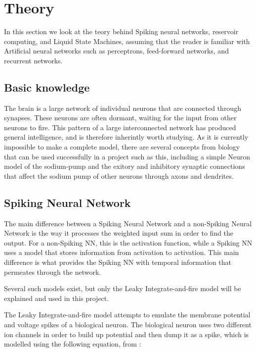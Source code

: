 \chapter{Theory}

In this section we look at the teory behind Spiking neural networks, reservoir computing, and Liquid State Machines, assuming that the reader is familiar with Artificial neural networks such as perceptrons, feed-forward networks, and recurrent networks.

\section{Basic knowledge}

The brain is a large network of individual neurons that are connected through synapses. These neurons are often dormant, waiting for the input from other neurons to fire. This pattern of a large interconnected network has produced general intelligence, and is therefore inherintly worth studying. As it is currently impossible to make a complete model, there are several concepts from biology that can be used successfully in a project such as this, including a simple Neuron model of the sodium-pump and the exitory and inhibitory synaptic connections that affect the sodium pump of other neurons through axons and dendrites.

\section{Spiking Neural Network}

The main difference between a Spiking Neural Network and a non-Spiking Neural Network is the way it processes the weighted input sum in order to find the output. For a non-Spiking NN, this is the activation function, while a Spiking NN uses a model that stores information from activation to activation. This main difference is what provides the Spiking NN with temporal information that permeates through the network.

Several such models exist, but only the Leaky Integrate-and-fire model \cite{Leaky} will be explained and used in this project. %

The Leaky Integrate-and-fire model attempts to emulate the membrane potential and voltage spikes of a biological neuron. The biological neuron uses two different ion channels in order to build up potential and then dump it as a spike, which is modelled using the following equation, from \cite{leaky}:

